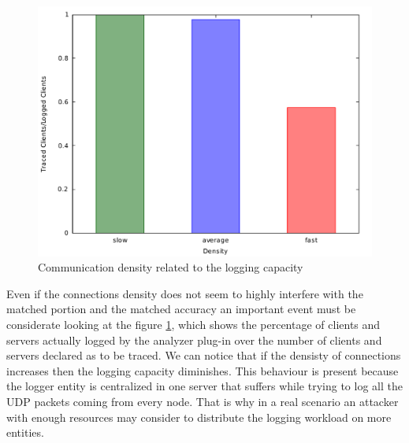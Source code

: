 \begin{figure}[H]
	\centering
	\includegraphics[scale=0.35]{graphs/density_clients_ration.pdf}
	\caption{Communication density related to the logging capacity}
	\label{fig:g_density}
\end{figure}

Even if the connections density does not seem to highly interfere with
the matched portion and the matched accuracy an important event must be
considerate looking at the figure \ref{fig:g_density}, which shows the
percentage of clients and servers actually logged by the analyzer
plug-in over the
number of clients and servers declared as to be traced. We can notice
that if the densisty of connections increases then the logging capacity diminishes.
This behaviour is present because the logger entity is centralized 
in one server that suffers while trying to log all the UDP packets
coming from every node. That is why in a real
scenario an attacker with enough resources may consider to distribute 
the logging workload on more
entities.

